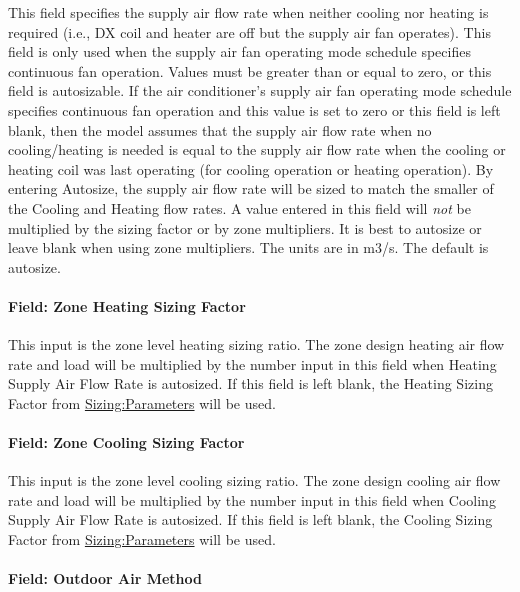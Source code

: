 This field specifies the supply air flow rate when neither cooling nor heating is required (i.e., DX coil and heater are off but the supply air fan operates). This field is only used when the supply air fan operating mode schedule specifies continuous fan operation. Values must be greater than or equal to zero, or this field is autosizable. If the air conditioner's supply air fan operating mode schedule specifies continuous fan operation and this value is set to zero or this field is left blank, then the model assumes that the supply air flow rate when no cooling/heating is needed is equal to the supply air flow rate when the cooling or heating coil was last operating (for cooling operation or heating operation). By entering Autosize, the supply air flow rate will be sized to match the smaller of the Cooling and Heating flow rates. A value entered in this field will \emph{not} be multiplied by the sizing factor or by zone multipliers. It is best to autosize or leave blank when using zone multipliers. The units are in m3/s. The default is autosize.

\paragraph{Field: Zone Heating Sizing Factor}\label{field-zone-heating-sizing-factor-3}

This input is the zone level heating sizing ratio. The zone design heating air flow rate and load will be multiplied by the number input in this field when Heating Supply Air Flow Rate is autosized. If this field is left blank, the Heating Sizing Factor from \hyperref[sizingparameters]{Sizing:Parameters} will be used.

\paragraph{Field: Zone Cooling Sizing Factor}\label{field-zone-cooling-sizing-factor-2}

This input is the zone level cooling sizing ratio. The zone design cooling air flow rate and load will be multiplied by the number input in this field when Cooling Supply Air Flow Rate is autosized. If this field is left blank, the Cooling Sizing Factor from \hyperref[sizingparameters]{Sizing:Parameters} will be used.

\paragraph{Field: Outdoor Air Method}\label{field-outdoor-air-method-4}

